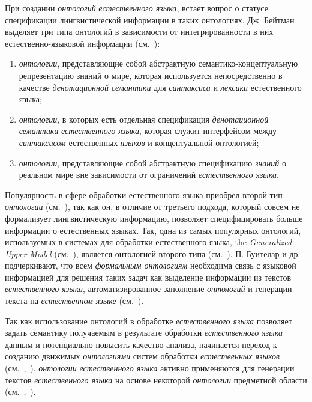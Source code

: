 При создании \textit{онтологий} \textit{естественного языка}, встает вопрос о статусе спецификации лингвистической информации в таких онтологиях.
Дж. Бейтман выделяет три типа онтологий в зависимости от интегрированности в них естественно-языковой информации (см.~):
\begin{enumerate}
    \item \textit{онтологии}, представляющие собой абстрактную семантико-концептуальную репрезентацию знаний о мире, которая используется непосредственно в качестве \textit{денотационной семантики} для \textit{синтаксиса} и \textit{лексики} естественного языка;
    \item \textit{онтологии}, в которых есть отдельная спецификация \textit{денотационной семантики} \textit{естественного языка}, которая служит интерфейсом между \textit{синтаксисом} естественных \textit{языков} и концептуальной онтологией;
    \item \textit{онтологии}, представляющие собой абстрактную спецификацию \textit{знаний} о реальном мире вне зависимости от ограничений \textit{естественного языка}.
\end{enumerate}

Популярность в сфере обработки естественного языка приобрел второй тип \textit{онтологии} (см.~), так как он, в отличие от третьего подхода, который совсем не формализует лингвистическую информацию, позволяет специфицировать больше информации о естественных языках.
Так, одна из самых популярных онтологий, используемых в системах для обработки естественного языка, the \textit{Generalized Upper Model} (см.~), является онтологией второго типа (см.~).
П. Буителар и др. подчеркивают, что всем \textit{формальным онтологиям} необходима связь с языковой информацией для решения таких задач как выделение информации из текстов \textit{естественного языка}, автоматизированное заполнение \textit{онтологий} и генерации текста на \textit{естественном языке} (см.~).

Так как использование онтологий в обработке \textit{естественного языка} позволяет задать семантику получаемым в результате обработки \textit{естественного языка} данным и потенциально повысить качество анализа, начинается переход к созданию движимых \textit{онтологиями} систем обработки \textit{естественных языков} (см.~,~).
    \textit{онтологии} \textit{естественного языка} активно применяются для генерации текстов \textit{естественного языка} на основе некоторой \textit{онтологии} предметной области (см.~,~).

